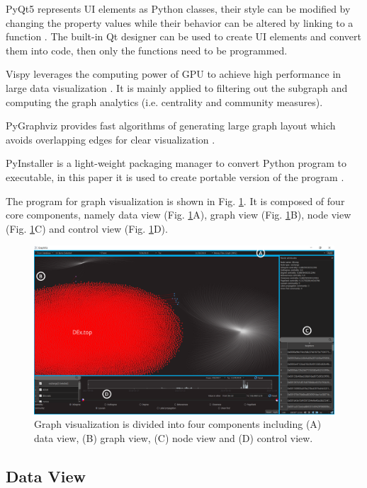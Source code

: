 PyQt5 represents UI elements as Python classes, their style can be modified by changing the property values while their behavior can be altered by linking to a function \cite{2}. The built-in Qt designer can be used to create UI elements and convert them into code, then only the functions need to be programmed.

Vispy leverages the computing power of GPU to achieve high performance in large data visualization \cite{12}. It is mainly applied to filtering out the subgraph and computing the graph analytics (i.e. centrality and community measures).

PyGraphviz provides fast algorithms of generating large graph layout which avoids overlapping edges for clear visualization \cite{15}.

PyInstaller is a light-weight packaging manager to convert Python program to executable, in this paper it is used to create portable version of the program \cite{20}.

The program for graph visualization is shown in Fig. \ref{fig:view}. It is composed of four core components, namely data view (Fig. \ref{fig:view}A), graph view (Fig. \ref{fig:view}B), node view (Fig. \ref{fig:view}C) and control view (Fig. \ref{fig:view}D).

\begin{figure}[htb]
\includegraphics[width=\textwidth]{gfx/view.png}
\caption{Graph visualization is divided into four components including (A) data view, (B) graph view, (C) node view and (D) control view.}
\label{fig:view}
\end{figure}

\subsection{Data View}
\label{sec:methodology:view:data}

